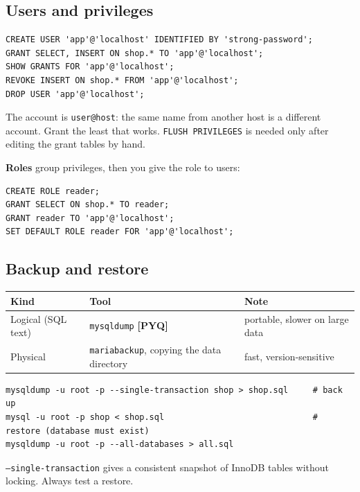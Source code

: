 \documentclass[11pt,a4paper]{article}
\newcommand{\pyq}{\textcolor{ember}{\scriptsize\textbf{[PYQ]}}}
\begin{document}
\subsection{Users and privileges}
\begin{lstlisting}
CREATE USER 'app'@'localhost' IDENTIFIED BY 'strong-password';
GRANT SELECT, INSERT ON shop.* TO 'app'@'localhost';
SHOW GRANTS FOR 'app'@'localhost';
REVOKE INSERT ON shop.* FROM 'app'@'localhost';
DROP USER 'app'@'localhost';
\end{lstlisting}
The account is \texttt{user@host}: the same name from another host is a different account. Grant the least that works. \texttt{FLUSH PRIVILEGES} is needed only after editing the grant tables by hand.

\textbf{Roles} group privileges, then you give the role to users:

\begin{lstlisting}
CREATE ROLE reader;
GRANT SELECT ON shop.* TO reader;
GRANT reader TO 'app'@'localhost';
SET DEFAULT ROLE reader FOR 'app'@'localhost';
\end{lstlisting}
\subsection{Backup and restore}
\begin{center}\small\renewcommand{\arraystretch}{1.18}\setlength{\tabcolsep}{9pt}
\begin{tabularx}{\linewidth}{@{}>{\raggedright\arraybackslash}X>{\raggedright\arraybackslash}X>{\raggedright\arraybackslash}X@{}}
\toprule
\textbf{\color{slate}Kind} & \textbf{\color{slate}Tool} & \textbf{\color{slate}Note} \\ \midrule
Logical (SQL text) & \texttt{mysqldump} \pyq{} & portable, slower on large data \\
Physical & \texttt{mariabackup}, copying the data directory & fast, version-sensitive \\
\bottomrule
\end{tabularx}\end{center}
\begin{lstlisting}
mysqldump -u root -p --single-transaction shop > shop.sql     # back up
mysql -u root -p shop < shop.sql                              # restore (database must exist)
mysqldump -u root -p --all-databases > all.sql
\end{lstlisting}
\texttt{--single-transaction} gives a consistent snapshot of InnoDB tables without locking. Always test a restore.
\end{document}
